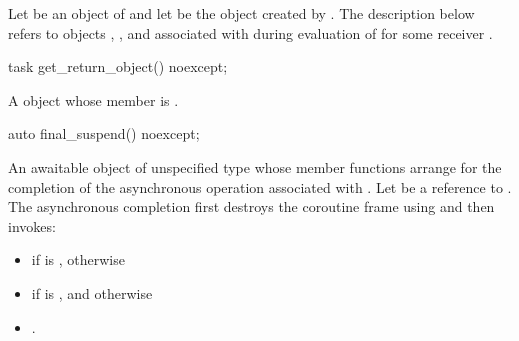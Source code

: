 \pnum
Let  be an object of 
and let  be the  object
created by .
The description below
refers to objects ,
,
and 
associated with 
during evaluation of 
for some receiver .

%
\begin{itemdecl}
task get_return_object() noexcept;
\end{itemdecl}
\begin{itemdescr}
\pnum
\returns
A  object whose member  is
.
\end{itemdescr}

%
\begin{itemdecl}
auto final_suspend() noexcept;
\end{itemdecl}
\begin{itemdescr}
\pnum
\returns
An awaitable object of unspecified type whose
member functions arrange for the completion of the asynchronous
operation associated with .
Let  be a reference to .
The asynchronous completion first destroys the coroutine frame
using  and then invokes:
\begin{itemize}
\item
{}
if  is , otherwise
\item
{} if  is ,
and otherwise
\item
 .
\end{itemize}
\end{itemdescr}

